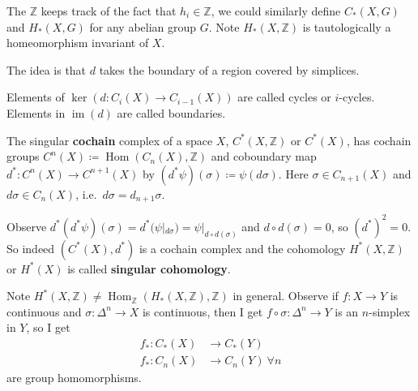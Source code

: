 \documentclass{article}
\DeclareMathOperator{\im}{im}
\DeclareMathOperator{\Hom}{Hom}
\begin{document}
The $\mathbb{Z}$ keeps track of the fact that $h_i \in \mathbb{Z}$, we could similarly define $C_*(X, G)$ and $H_*(X,G)$ for any abelian group $G$.
Note $H_*(X,\mathbb{Z})$ is tautologically a homeomorphism invariant of $X$.

The idea is that $d$ takes the boundary of a region covered by simplices.

Elements of $\ker(d: C_i(X) \to C_{i-1}(X))$ are called cycles or $i$-cycles.
Elements in $\im(d)$ are called boundaries.

\begin{defi} 
  The singular \textbf{cochain} complex of a space $X$, $C^*(X, \mathbb{Z})$ or $C^*(X)$, has cochain groups $C^n(X) \coloneqq \Hom(C_n(X), \mathbb{Z})$ and coboundary map $d^*: C^n(X) \to C^{n+1}(X)$ by $(d^* \psi)(\sigma) \coloneqq \psi(d \sigma)$. Here $\sigma \in C_{n+1}(X)$ and $d \sigma \in C_n(X)$, i.e.\ $d \sigma = d_{n+1} \sigma$.
\end{defi}
Observe $d^*(d^* \psi) (\sigma) = d^*(\psi|_{d \sigma}) = \psi|_{d \circ d(\sigma)}$ and $d \circ d(\sigma) = 0$, so $(d^*)^2 = 0$.
So indeed $(C^*(X), d^*)$ is a cochain complex and the cohomology $H^*(X,\mathbb{Z})$ or $H^*(X)$ is called \textbf{singular cohomology}.

Note $H^*(X,\mathbb{Z}) \neq \Hom_{\mathbb{Z}}(H_*(X,\mathbb{Z}),\mathbb{Z})$ in general.
Observe if $f: X \to Y$ is continuous and $\sigma: \Delta^n \to X$ is continuous, then I get $f \circ \sigma: \Delta^n \to Y$ is an $n$-simplex in $Y$, so I get
\begin{align*}
  f_*: C_*(X) &\to C_*(Y) \\
  f_*: C_n(X) &\to C_n(Y) \ \forall n
\end{align*}
are group homomorphisms.
\end{document}
